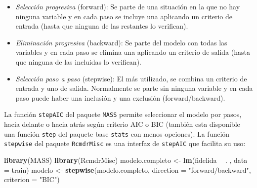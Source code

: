 \documentclass[
]{book}
\newenvironment{Shaded}{\begin{snugshade}}{\end{snugshade}}
\newcommand{\DataTypeTok}[1]{\textcolor[rgb]{0.13,0.29,0.53}{#1}}
\newcommand{\KeywordTok}[1]{\textcolor[rgb]{0.13,0.29,0.53}{\textbf{#1}}}
\newcommand{\NormalTok}[1]{#1}
\newcommand{\OperatorTok}[1]{\textcolor[rgb]{0.81,0.36,0.00}{\textbf{#1}}}
\newcommand{\StringTok}[1]{\textcolor[rgb]{0.31,0.60,0.02}{#1}}
\theoremstyle{break}
\theoremstyle{definition}
\theoremstyle{definition}
\theoremstyle{definition}
\theoremstyle{remark}
\begin{document}
\begin{itemize}
\item
  \emph{Selección progresiva} (forward): Se parte de una situación en la
  que no hay ninguna variable y en cada paso se incluye una aplicando
  un criterio de entrada (hasta que ninguna de las restantes lo
  verifican).
\item
  \emph{Eliminación progresiva} (backward): Se parte del modelo con todas
  las variables y en cada paso se elimina una aplicando un criterio
  de salida (hasta que ninguna de las incluidas lo verifican).
\item
  \emph{Selección paso a paso} (stepwise): El más utilizado, se combina
  un criterio de entrada y uno de salida. Normalmente se parte sin
  ninguna variable y en cada paso puede haber una inclusión y una
  exclusión (forward/backward).
\end{itemize}

La función \texttt{stepAIC} del paquete \texttt{MASS} permite seleccionar el modelo por pasos, hacia delante o hacia atrás según criterio AIC o BIC (también esta disponible una función \texttt{step} del paquete base \texttt{stats} con menos opciones).
La función \texttt{stepwise} del paquete \texttt{RcmdrMisc} es una interfaz de \texttt{stepAIC} que facilita su uso:

\begin{Shaded}
\begin{Highlighting}[]
\KeywordTok{library}\NormalTok{(MASS)}
\KeywordTok{library}\NormalTok{(RcmdrMisc)}
\NormalTok{modelo.completo <-}\StringTok{ }\KeywordTok{lm}\NormalTok{(fidelida }\OperatorTok{~}\StringTok{ }\NormalTok{. , }\DataTypeTok{data =}\NormalTok{ train)}
\NormalTok{modelo <-}\StringTok{ }\KeywordTok{stepwise}\NormalTok{(modelo.completo, }\DataTypeTok{direction =} \StringTok{"forward/backward"}\NormalTok{, }\DataTypeTok{criterion =} \StringTok{"BIC"}\NormalTok{)}
\end{Highlighting}
\end{Shaded}
\end{document}
